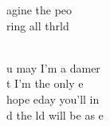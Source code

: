 \begin{cancion}
	\begin{chorus}%
	agine  the peo\\
	ring all thrld\\
	\end{chorus}%
	\jump\\
	u may  I'm a damer \\
	t I'm  the only e  \\
	hope eday you'll in \\
	d the ld will be as e\\
\end{cancion}%
